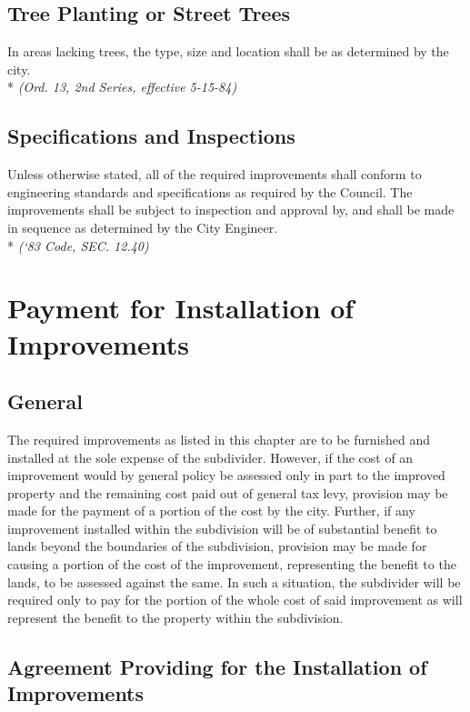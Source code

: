 \subsection{Tree Planting or Street Trees}
In areas lacking trees, the type, size and location shall be as determined by the city.\\*
\emph{(Ord. 13, 2nd Series, effective 5-15-84)}
\subsection{Specifications and Inspections}
Unless otherwise stated, all of the required improvements shall conform to engineering standards and specifications as required by the Council. The improvements shall be subject to inspection and approval by, and shall be made in sequence as determined by the City Engineer.\\*
\emph{(‘83 Code, SEC. 12.40)}
\section{Payment for Installation of Improvements}
\subsection{General}
The required improvements as listed in this chapter are to be furnished and installed at the sole expense of the subdivider. However, if the cost of an improvement would by general policy be assessed only in part to the improved property and the remaining cost paid out of general tax levy, provision may be made for the payment of a portion of the cost by the city. Further, if any improvement installed within the subdivision will be of substantial benefit to lands beyond the boundaries of the subdivision, provision may be made for causing a portion of the cost of the improvement, representing the benefit to the lands, to be assessed against the same. In such a situation, the subdivider will be required only to pay for the portion of the whole cost of said improvement as will represent the benefit to the property within the subdivision.
\subsection{Agreement Providing for the Installation of Improvements}
